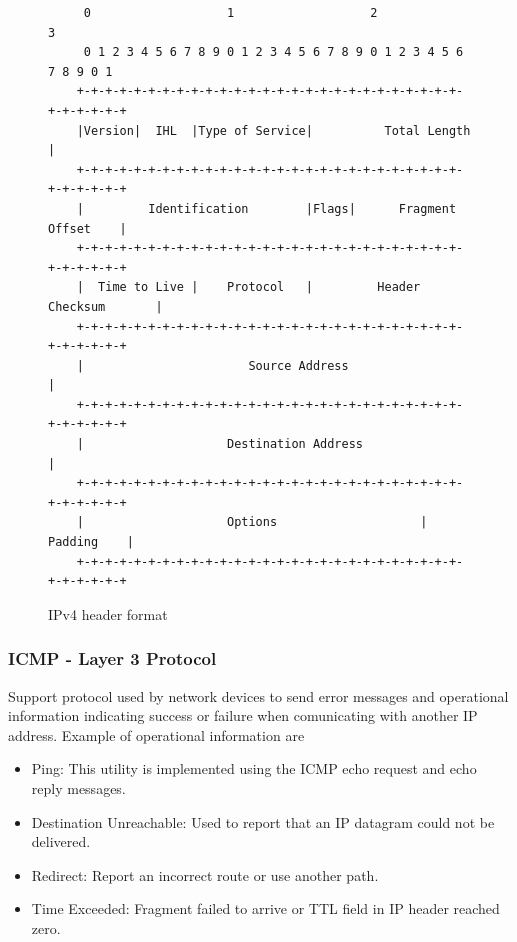 \documentclass[11pt]{article}
\begin{document}
\begin{figure}[H]
    \centering
    \footnotesize
    \begin{varwidth}{\linewidth}
    \begin{verbatim}
     0                   1                   2                   3
     0 1 2 3 4 5 6 7 8 9 0 1 2 3 4 5 6 7 8 9 0 1 2 3 4 5 6 7 8 9 0 1
    +-+-+-+-+-+-+-+-+-+-+-+-+-+-+-+-+-+-+-+-+-+-+-+-+-+-+-+-+-+-+-+-+
    |Version|  IHL  |Type of Service|          Total Length         |
    +-+-+-+-+-+-+-+-+-+-+-+-+-+-+-+-+-+-+-+-+-+-+-+-+-+-+-+-+-+-+-+-+
    |         Identification        |Flags|      Fragment Offset    |
    +-+-+-+-+-+-+-+-+-+-+-+-+-+-+-+-+-+-+-+-+-+-+-+-+-+-+-+-+-+-+-+-+
    |  Time to Live |    Protocol   |         Header Checksum       |
    +-+-+-+-+-+-+-+-+-+-+-+-+-+-+-+-+-+-+-+-+-+-+-+-+-+-+-+-+-+-+-+-+
    |                       Source Address                          |
    +-+-+-+-+-+-+-+-+-+-+-+-+-+-+-+-+-+-+-+-+-+-+-+-+-+-+-+-+-+-+-+-+
    |                    Destination Address                        |
    +-+-+-+-+-+-+-+-+-+-+-+-+-+-+-+-+-+-+-+-+-+-+-+-+-+-+-+-+-+-+-+-+
    |                    Options                    |    Padding    |
    +-+-+-+-+-+-+-+-+-+-+-+-+-+-+-+-+-+-+-+-+-+-+-+-+-+-+-+-+-+-+-+-+
    \end{verbatim}
    \end{varwidth}
    \caption{IPv4 header format}\label{fig:ipv4_header}
\end{figure}

\subsubsection{ICMP - Layer 3 Protocol}

Support protocol used by network devices to send error messages and operational
information indicating success or failure when comunicating with another IP
address.\cite{wiki:icmp} Example of operational information are

\begin{itemize}
    \item Ping: This utility is implemented using the ICMP echo request and echo
          reply messages.
    \item Destination Unreachable: Used to report that an IP datagram could not
          be delivered.
    \item Redirect: Report an incorrect route or use another path.
    \item Time Exceeded: Fragment failed to arrive or TTL field in IP header
          reached zero.
\end{itemize}
\end{document}
